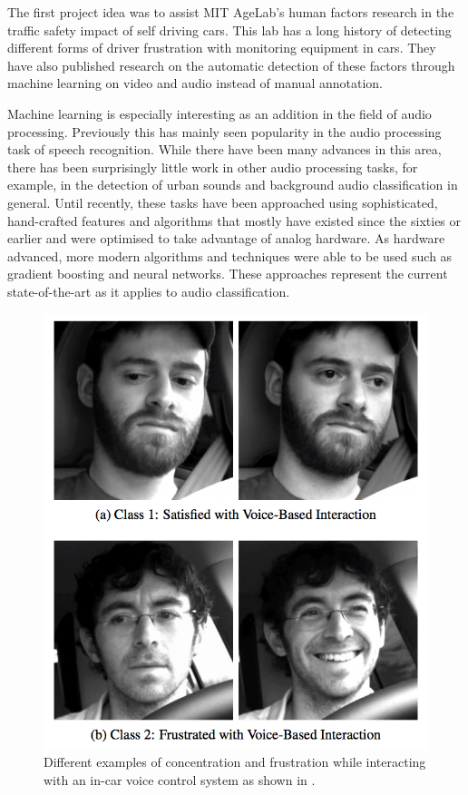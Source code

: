 The first project idea was to assist MIT AgeLab's human factors research in the traffic safety impact of self driving cars. This lab has a long history of detecting different forms of driver frustration with monitoring equipment in cars. They have also published research on the automatic detection of these factors through machine learning on video and audio \cite{Abdic:2016:DFD:3060621.3060809} instead of manual annotation.


Machine learning is especially interesting as an addition in the field of audio processing. Previously this has mainly seen popularity in the audio processing task of speech recognition. While there have been many advances in this area, there has been surprisingly little work in other audio processing tasks, for example, in the detection of urban sounds and background audio classification in general. Until recently, these tasks have been approached using sophisticated, hand-crafted features and algorithms that mostly have existed since the sixties or earlier and were optimised to take advantage of analog hardware. As hardware advanced, more modern algorithms and techniques were able to be used such as gradient boosting and neural networks. These approaches represent the current state-of-the-art as it applies to audio classification.

\begin{figure}[h]
    \centering
	\includegraphics[width=.65\textwidth]{./images/illustrations/driver-frustration}
    \caption{Different examples of concentration and frustration while interacting with an in-car voice control system as shown in \cite{Abdic:2016:DFD:3060621.3060809}.}
    \label{fig:am}
\end{figure}


